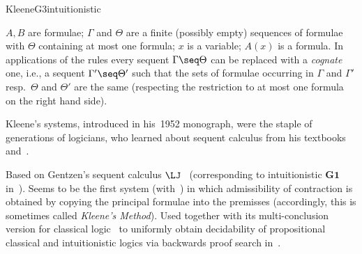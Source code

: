 \begin{entry}{KleeneG3intuitionistic}
\begin{clarifications}
  $A,B$ are formulae; $\Gamma$ and $\Theta$ are a finite (possibly
  empty) sequences of formulae with $\Theta$ containing at most one
  formula; $x$ is a variable; $A(x)$ is a formula. In applications of
  the rules every sequent $\Gamma \seq \Theta$ can be replaced with a
  \emph{cognate} one, i.e., a sequent $\Gamma' \seq \Theta'$ such that
  the sets of formulae occurring in $\Gamma$ and $\Gamma'$ resp.\
  $\Theta$ and $\Theta'$ are the same (respecting the restriction to
  at most one formula on the right hand side).
\end{clarifications}

\begin{history}
  Kleene's systems, introduced in his~1952 monograph, were the staple of
  generations of logicians, who learned about sequent calculus from
  his textbooks~\cite{Kleene:1952} and~\cite{Kleene:1967}.
\end{history}

\begin{technicalities}
  Based on Gentzen's sequent calculus $\LJ$~
  (corresponding to intuitionistic $\mathbf{G1}$
  in~\cite{Kleene:1952}). Seems to be the first system
  (with~) in which admissibility of
  contraction is obtained by copying the principal formulae into the
  premisses (accordingly, this is sometimes called \emph{Kleene's
  Method}). Used together with its multi-conclusion version for
  classical logic~ to uniformly obtain
  decidability of propositional classical and intuitionistic logics via
  backwards proof search in~\cite{Kleene:1952}.
\end{technicalities}

\nocite{Kleene:1952}

\end{entry}
